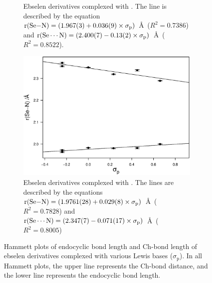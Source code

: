 \begin{refsection}
\begin{figure}
\begin{subfigure}[t]{0.45\linewidth}
\caption{Ebselen derivatives complexed with . The line is described by the equation $\mathrm{r}(\ce{Se-N}) = (1.967(3) + 0.036(9) \times \sigma_\text{p})$~\AA~($R^2=0.7386$) and $\mathrm{r}(\ce{Se\cdots N}) = (2.400(7) - 0.13(2) \times \sigma_\text{p})$~\AA~($R^2=0.8522$).}\label{fig:hammett-morph-para}
\end{subfigure}
\hfill
\begin{subfigure}[t]{0.45\linewidth}
\centering
\includegraphics[width=\linewidth]{Figures/hammett-pyrrol-p.eps}
\caption{Ebselen derivatives complexed with . The lines are described by the equations $\mathrm{r}(\ce{Se-N}) = (1.9761(28) + 0.029(8) \times \sigma_\text{p})$~\AA~($R^2=0.7828$) and $\mathrm{r}(\ce{Se\cdots N}) = (2.347(7) - 0.071(17) \times \sigma_\text{p})$~\AA~($R^2=0.8005$)}\label{fig:hammett-pyrrol-para}
\end{subfigure}
\caption[Hammett plots of endocyclic  bond length and  Ch-bond length of ebselen derivatives complexed with various Lewis bases ($\sigma_\text{p}$).]{Hammett plots of endocyclic  bond length and  Ch-bond length of ebselen derivatives complexed with various Lewis bases ($\sigma_\text{p}$). In all Hammett plots, the upper line represents the  Ch-bond distance, and the lower line represents the endocyclic  bond length.}
\end{figure}


\end{refsection}
